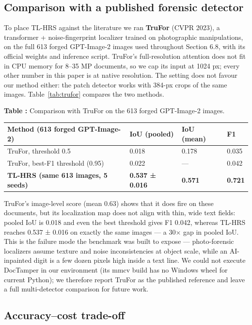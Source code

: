 \documentclass[preprint,12pt]{elsarticle}
\newcounter{tabno}
\newcommand{\tabcaption}[1]{\par\needspace{9\baselineskip}\refstepcounter{tabno}\noindent\textbf{Table \thetabno:} #1\par\vspace{2pt}}
\begin{document}
\subsection{Comparison with a published forensic detector}\label{comparison-with-a-published-forensic-detector}

To place TL-HRS against the literature we ran \textbf{TruFor} (CVPR 2023), a transformer + noise-fingerprint localizer trained on photographic manipulations, on the full 613 forged GPT-Image-2 images used throughout Section 6.8, with its official weights and inference script. TruFor's full-resolution attention does not fit in CPU memory for 8--35 MP documents, so we cap its input at 1024 px; every other number in this paper is at native resolution. The setting does not favour our method either: the patch detector works with 384-px crops of the same images. Table~\ref{tab:trufor} compares the two methods.

{
\tabcaption{Comparison with TruFor on the 613 forged GPT-Image-2 images.}\label{tab:trufor}
\begin{longtable}[]{@{}llll@{}}
\toprule\noalign{}

Method (613 forged GPT-Image-2)
 & 
IoU (pooled)
 & 
IoU (mean)
 & 
F1
 \\
\midrule\noalign{}
\endhead
\bottomrule\noalign{}
\endlastfoot
TruFor, threshold 0.5 & 0.018 & 0.178 & 0.035 \\
TruFor, best-F1 threshold (0.95) & 0.022 & --- & 0.042 \\
\textbf{TL-HRS (same 613 images, 5 seeds)} & \textbf{0.537 ± 0.016} & \textbf{0.571} & \textbf{0.721} \\
\end{longtable}
}

TruFor's image-level score (mean 0.63) shows that it does fire on these documents, but its localization map does not align with thin, wide text fields: pooled IoU is 0.018 and even the best threshold gives F1 0.042, whereas TL-HRS reaches 0.537 ± 0.016 on exactly the same images --- a 30× gap in pooled IoU. This is the failure mode the benchmark was built to expose --- photo-forensic localizers assume texture and noise inconsistencies at object scale, while an AI-inpainted digit is a few dozen pixels high inside a text line. We could not execute DocTamper in our environment (its mmcv build has no Windows wheel for current Python); we therefore report TruFor as the published reference and leave a full multi-detector comparison for future work.

\subsection{Accuracy--cost trade-off}\label{accuracycost-trade-off}
\end{document}
